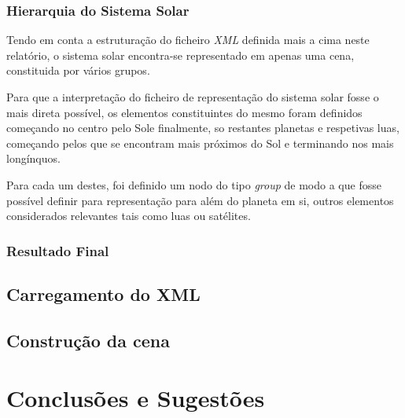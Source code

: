 \documentclass[a4paper]{article}
\begin{document}
\subsubsection{Hierarquia do Sistema Solar}

\hspace{3mm} Tendo em conta a estruturação do ficheiro \emph{XML} definida mais a cima neste relatório, o sistema solar encontra-se representado em apenas uma cena, constituida por vários grupos.

\par Para que a interpretação do ficheiro de representação do sistema solar fosse o mais direta possível, os elementos constituintes do mesmo foram definidos começando no centro pelo Sole finalmente, so restantes planetas e respetivas luas, começando pelos que se encontram mais próximos do Sol e terminando nos mais longínquos.

\par Para cada um destes, foi definido um nodo do tipo \emph{group} de modo a que fosse possível definir para representação para além do planeta em si, outros elementos considerados relevantes tais como luas ou satélites.


\subsubsection{Resultado Final}



\subsection{Carregamento do XML} %




\subsection{Construção da cena} %


\newpage
\section{Conclusões e Sugestões}



\newpage


\end{document}
